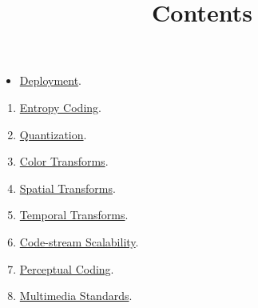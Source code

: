 

\title{\SM{} \newline Contents}

\maketitle

\begin{itemize}
  \item \href{https://sistemas-multimedia.github.io/contents/deployment}{Deployment}. %
\end{itemize}
\begin{enumerate}
\item \href{https://sistemas-multimedia.github.io/contents/entropy_coding}{Entropy Coding}.  %
\item \href{https://sistemas-multimedia.github.io/contents/quantization}{Quantization}.  %
\item \href{https://sistemas-multimedia.github.io/contents/color_transforms}{Color Transforms}.  %
\item \href{https://sistemas-multimedia.github.io/contents/spatial_transforms}{Spatial Transforms}.  %
\item \href{https://sistemas-multimedia.github.io/contents/temporal_transforms}{Temporal Transforms}.  %
\item \href{https://sistemas-multimedia.github.io/contents/data_scalability}{Code-stream Scalability}.  %
\item \href{https://sistemas-multimedia.github.io/contents/perceptual_coding}{Perceptual Coding}.  %
\item \href{https://sistemas-multimedia.github.io/contents/standards}{Multimedia Standards}.  %
\end{enumerate}

